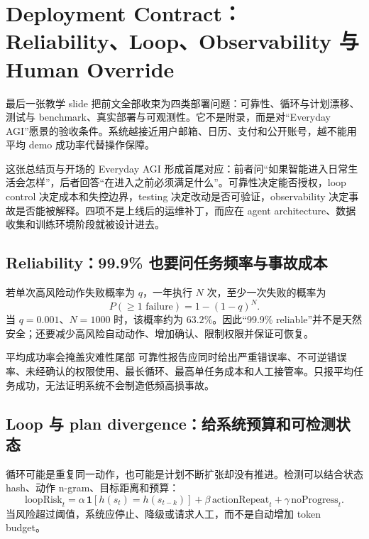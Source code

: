 \section{Deployment Contract：Reliability、Loop、Observability 与 Human Override}

最后一张教学 slide 把前文全部收束为四类部署问题：可靠性、循环与计划漂移、测试与 benchmark、真实部署与可观测性。它不是附录，而是对“Everyday AGI”愿景的验收条件。系统越接近用户邮箱、日历、支付和公开账号，越不能用平均 demo 成功率代替操作保障。


这张总结页与开场的 Everyday AGI 形成首尾对应：前者问“如果智能进入日常生活会怎样”，后者回答“在进入之前必须满足什么”。可靠性决定能否授权，loop control 决定成本和失控边界，testing 决定改动是否可验证，observability 决定事故是否能被解释。四项不是上线后的运维补丁，而应在 agent architecture、数据收集和训练环境阶段就被设计进去。

\subsection{Reliability：99.9\% 也要问任务频率与事故成本}

若单次高风险动作失败概率为 $q$，一年执行 $N$ 次，至少一次失败的概率为
\[
P(\ge 1\text{ failure})=1-(1-q)^N.
\]
当 $q=0.001$、$N=1000$ 时，该概率约为 $63.2\%$。因此“99.9\% reliable”并不是天然安全；还要减少高风险自动动作、增加确认、限制权限并保证可恢复。


\begin{warningbox}{平均成功率会掩盖灾难性尾部}
可靠性报告应同时给出严重错误率、不可逆错误率、未经确认的权限使用、最长循环、最高单任务成本和人工接管率。只报平均任务成功，无法证明系统不会制造低频高损事故。
\end{warningbox}

\subsection{Loop 与 plan divergence：给系统预算和可检测状态}

循环可能是重复同一动作，也可能是计划不断扩张却没有推进。检测可以结合状态 hash、动作 n-gram、目标距离和预算：
\[
\text{loopRisk}_t=
\alpha\,\mathbf{1}[h(s_t)=h(s_{t-k})]
+\beta\,\text{actionRepeat}_t
+\gamma\,\text{noProgress}_t.
\]
当风险超过阈值，系统应停止、降级或请求人工，而不是自动增加 token budget。

